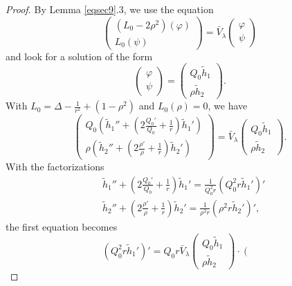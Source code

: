 \documentclass[10pt,a4paper]{amsart}
\begin{document}
\begin{proof}
  By Lemma \ref{eqsec9}.3, we use the equation
  \[ \left(\begin{array}{c}
       (L_0 - 2 \rho^2) (\varphi)\\
       L_0 (\psi)
     \end{array}\right) = \bar{V}_{\lambda} \left(\begin{array}{c}
       \varphi\\
       \psi
     \end{array}\right) \]
  and look for a solution of the form
  \[ \left(\begin{array}{c}
       \varphi\\
       \psi
     \end{array}\right) = \left(\begin{array}{c}
       Q_0 \widetilde{h}_1\\
       \rho \widetilde{h}_2
     \end{array}\right) . \]
  With $L_0 = \Delta - \frac{1}{r^2} + (1 - \rho^2)$ and $L_0 (\rho) = 0$, we
  have
  \[ \left(\begin{array}{c}
       Q_0 \left( \widetilde{h}_1'' + \left( 2 \frac{Q_0'}{Q_0} + \frac{1}{r}
       \right) \widetilde{h}_1' \right)\\
       \rho \left( \widetilde{h}_2'' + \left( 2 \frac{\rho'}{\rho} + \frac{1}{r}
       \right) \widetilde{h}_2' \right)
     \end{array}\right) = \bar{V}_{\lambda} \left(\begin{array}{c}
       Q_0 \widetilde{h}_1\\
       \rho \widetilde{h}_2
     \end{array}\right) . \]
  With the factorizations
\begin{align*}
& \widetilde{h}_1'' + \left( 2 \frac{Q_0'}{Q_0} + \frac{1}{r} \right)
     \widetilde{h}_1' = \frac{1}{Q_0^2 r} (Q_0^2 r \widetilde{h}_1')' \\
& \widetilde{h}_2'' + \left( 2 \frac{\rho'}{\rho} + \frac{1}{r} \right)
     \widetilde{h}_2' = \frac{1}{\rho^2 r} (\rho^2 r \widetilde{h}_2')',
\end{align*}
the first equation becomes
  \[ (Q_0^2 r \widetilde{h}_1')' = Q_0 r \bar{V}_{\lambda} \left(\begin{array}{c}
       Q_0 \widetilde{h}_1\\
       \rho \widetilde{h}_2
     \end{array}\right) \cdot \left(\begin{array}{c}

\end{array}\]
\end{proof}
\end{document}

